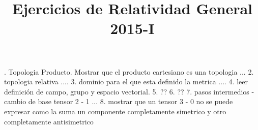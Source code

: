 \documentclass[english]{article}
\begin{document}
\title{Ejercicios de Relatividad General 2015-I}

. Topologia Producto. Mostrar que el producto cartesiano es una topologia ...
2. topologia relativa ....
3. dominio para el que esta definido la metrica ....
4. leer definición de campo, grupo y espacio vectorial.
5. ??
6. ??
7. pasos intermedios - cambio de base tensor 2 - 1 ...
8. mostrar que un tensor 3 - 0 no se puede expresar como la suma un componente completamente simetrico y otro completamente antisimetrico
\end{document}
